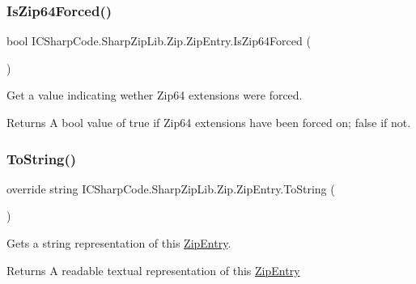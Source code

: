 \subsubsection{\texorpdfstring{Is\+Zip64\+Forced()}{IsZip64Forced()}\hspace{0.1cm}{\footnotesize\ttfamily [2/2]}}
{\footnotesize\ttfamily bool I\+C\+Sharp\+Code.\+Sharp\+Zip\+Lib.\+Zip.\+Zip\+Entry.\+Is\+Zip64\+Forced (\begin{DoxyParamCaption}{ }\end{DoxyParamCaption})\hspace{0.3cm}{\ttfamily [inline]}}



Get a value indicating wether Zip64 extensions were forced. 

\begin{DoxyReturn}{Returns}
A bool value of true if Zip64 extensions have been forced on; false if not.
\end{DoxyReturn}
\mbox{\label{class_i_c_sharp_code_1_1_sharp_zip_lib_1_1_zip_1_1_zip_entry_a0cd045443176515f91c959537d8c8b51}} 
\subsubsection{\texorpdfstring{To\+String()}{ToString()}\hspace{0.1cm}{\footnotesize\ttfamily [1/2]}}
{\footnotesize\ttfamily override string I\+C\+Sharp\+Code.\+Sharp\+Zip\+Lib.\+Zip.\+Zip\+Entry.\+To\+String (\begin{DoxyParamCaption}{ }\end{DoxyParamCaption})\hspace{0.3cm}{\ttfamily [inline]}}



Gets a string representation of this \hyperlink{class_i_c_sharp_code_1_1_sharp_zip_lib_1_1_zip_1_1_zip_entry}{Zip\+Entry}. 

\begin{DoxyReturn}{Returns}
A readable textual representation of this \hyperlink{class_i_c_sharp_code_1_1_sharp_zip_lib_1_1_zip_1_1_zip_entry}{Zip\+Entry}
\end{DoxyReturn}
\mbox{\label{class_i_c_sharp_code_1_1_sharp_zip_lib_1_1_zip_1_1_zip_entry_a0cd045443176515f91c959537d8c8b51}} 
